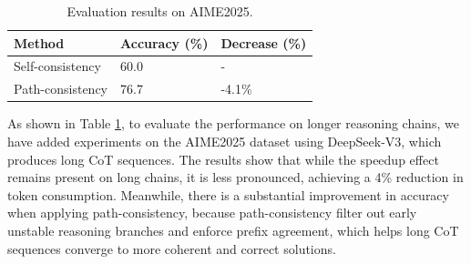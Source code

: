 \begin{table}
  \caption{Evaluation results on AIME2025.}
  \label{tab:long chain}
\begin{scriptsize}
\setlength{\tabcolsep}{16pt}
\begin{tabular}{@{}lll@{}}
\toprule
Method            & Accuracy (\%) & Decrease (\%) \\ \midrule
Self-consistency                & 60.0          & -             \\
Path-consistency                & 76.7          & -4.1\%        \\ \bottomrule
\end{tabular}
\end{scriptsize}
\end{table}%
As shown in Table \ref{tab:long chain}, to evaluate the performance on longer reasoning chains, we have added experiments on the AIME2025 dataset using DeepSeek-V3, which produces long CoT sequences. The results show that while the speedup effect remains present on long chains, it is less pronounced, achieving a 4\% reduction in token consumption. Meanwhile, there is a substantial improvement in accuracy when applying path-consistency, because path-consistency filter out early unstable reasoning branches and enforce prefix agreement, which helps long CoT sequences converge to more coherent and correct solutions.




